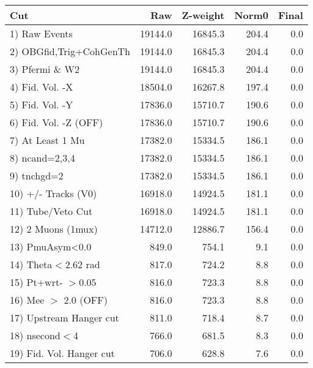  \begin{table}[h!]\centering
 \begin{tabular}{||l||r|r|r|r||}
 \hline
 \hline
 Cut & Raw & Z-weight & Norm0 & Final \\
 \hline
  1) Raw Events           &     19144.0 &     16845.3 &       204.4 &         0.0 \\
  2) OBGfid,Trig+CohGenTh &     19144.0 &     16845.3 &       204.4 &         0.0 \\
  3) Pfermi \& W2         &     19144.0 &     16845.3 &       204.4 &         0.0 \\
  4) Fid. Vol. -X         &     18504.0 &     16267.8 &       197.4 &         0.0 \\
  5) Fid. Vol. -Y         &     17836.0 &     15710.7 &       190.6 &         0.0 \\
  6) Fid. Vol. -Z (OFF)   &     17836.0 &     15710.7 &       190.6 &         0.0 \\
  7) At Least 1 Mu        &     17382.0 &     15334.5 &       186.1 &         0.0 \\
  8) ncand=2,3,4          &     17382.0 &     15334.5 &       186.1 &         0.0 \\
  9) tnchgd=2             &     17382.0 &     15334.5 &       186.1 &         0.0 \\
 10) +/- Tracks (V0)      &     16918.0 &     14924.5 &       181.1 &         0.0 \\
 11) Tube/Veto Cut        &     16918.0 &     14924.5 &       181.1 &         0.0 \\
 12) 2 Muons (1mux)       &     14712.0 &     12886.7 &       156.4 &         0.0 \\
 13) PmuAsym<0.0          &       849.0 &       754.1 &         9.1 &         0.0 \\
 14) Theta$<$2.62 rad     &       817.0 &       724.2 &         8.8 &         0.0 \\
 15) Pt+wrt- $>$0.05      &       816.0 &       723.3 &         8.8 &         0.0 \\
 16) Mee $>$ 2.0  (OFF)   &       816.0 &       723.3 &         8.8 &         0.0 \\
 17) Upstream Hanger cut  &       811.0 &       718.4 &         8.7 &         0.0 \\
 18) nsecond$<$4          &       766.0 &       681.5 &         8.3 &         0.0 \\
 19) Fid. Vol. Hanger cut &       706.0 &       628.8 &         7.6 &         0.0 \\

\end{tabular}
\end{table}
